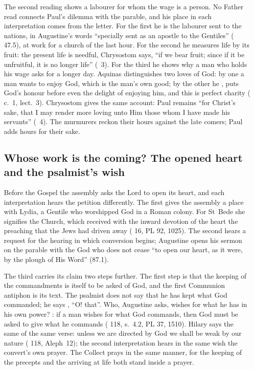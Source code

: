 The second reading shows a labourer for whom the wage is a person. No Father
read connects Paul's dilemma with the parable, and his place in each
interpretation comes from the letter. For the first he is the labourer
sent to the nations, in Augustine's words ``specially sent as an apostle to
the Gentiles'' ( 47.5), at work for a
church of the last hour. For the second he measures life by its fruit: the
present life is needful, Chrysostom says, ``if we bear fruit; since if it be
unfruitful, it is no longer life'' (~3). For the third he shows
why a man who holds his wage asks for a longer day. Aquinas distinguishes two
loves of God: by one a man wants to enjoy God,
which is the man's own good; by the other he , puts God's honour before even the
delight of enjoying him, and this is perfect charity ( c.~1, lect.~3). Chrysostom gives the same account: Paul remains
``for Christ's sake, that I may render more loving unto Him those whom I have
made his servants'' (~4). The murmurers reckon
their hours against the late comers; Paul adds hours for their sake.

\subsection{Whose work is the coming? The opened heart and the psalmist's wish}

Before the Gospel the assembly asks the Lord to open its heart, and each
interpretation hears the petition differently. The first gives the assembly a
place with Lydia, a Gentile who worshipped God in a Roman colony. For St~Bede
she signifies the Church, which received with the inward devotion of the heart
the preaching that the Jews had driven away ( 16, PL
92, 1025). The second hears a request for the hearing in which conversion
begins; Augustine opens his sermon on the parable with the God who does not
cease ``to open our heart, as it were, by the plough of His Word'' (87.1).

The third carries its claim two steps further. The first step is that the
keeping of the commandments is itself to be asked of God, and the first
Communion antiphon is its text. The psalmist does not say that he has kept
what God commanded; he says , ``O! that''. Who, Augustine asks,
wishes for what he has in his own power? : if a man
wishes for what God commands, then God must be asked to give what he commands
( 118, s.~4.2, PL 37, 1510). Hilary says the same of the
same verse: unless we are directed by God we shall be weak by our nature
( 118, Aleph~12); the second interpretation hears in the same wish the convert's
own prayer. The Collect prays in the same manner, for the keeping of
the precepts and the arriving at life both stand inside a prayer.

